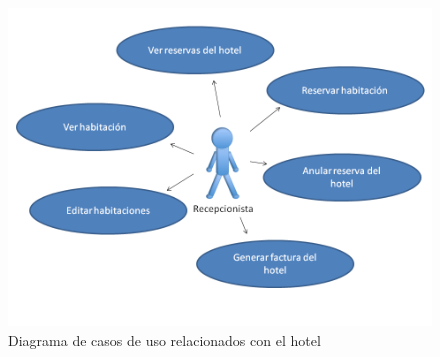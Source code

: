\documentclass[spanish,a4paper,11pt, twoside]{report}	%
\begin{document}
	\begin{figure}[!h]
		\centering
		\includegraphics[scale=0.5]{Habitaciones.png}
		\caption{Diagrama de casos de uso relacionados con el hotel}
	\end{figure}


\end{document}
